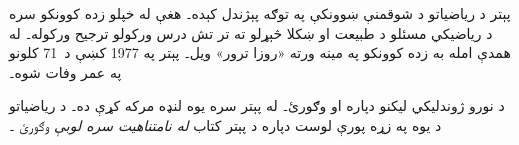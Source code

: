 \documentclass[../../../include/open-logic-section]{subfiles}
\begin{document}
پېتر د رياضياتو د شوقمنې ښوونکې په توګه
پېژندل کېده۔ هغې له خپلو زده کوونکو
سره د رياضيکي مسئلو د طبيعت او
ښکلا څېړلو ته تر تش درس ورکولو
ترجيح ورکوله۔ له همدې امله به
زده کوونکو په مينه ورته «روزا
ترور» ويل۔ پېتر په 1977 کښې
د~71 کلونو په عمر وفات شوه۔

\begin{reading}
د نورو ژوندليکي ليکنو دپاره
\citep{Oconnor2014} او \citep{Andrasfai1986}
وګورئ۔ \citet{Tamassy1994} له پېتر سره
يوه لنډه مرکه کړې ده۔ د رياضياتو
د يوه په زړه پورې لوست دپاره د
پېتر کتاب \emph{له نامتناهيت سره
لوبې} وګورئ \citep{Peter2010}۔
\end{reading}
\end{document}
